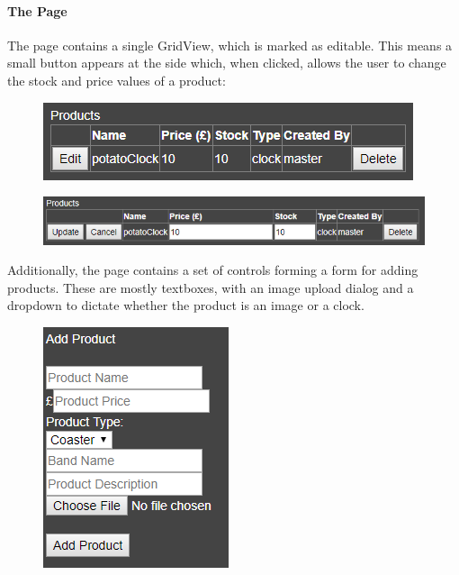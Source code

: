 ﻿\documentclass{article}
\begin{document}
    \paragraph{The Page}
    The page contains a single GridView, which is marked as editable.
    This means a small button appears at the side which, when clicked, allows the user to change the stock and price values of a product:
    \begin{figure}[H]
        \includegraphics{productsConfigTable.png}
        \centering
    \end{figure}
    \begin{figure}[H]
        \includegraphics{productsConfigEditing.png}
        \centering
    \end{figure}
    Additionally, the page contains a set of controls forming a form for adding products.
    These are mostly textboxes, with an image upload dialog and a dropdown to dictate whether the product is an image or a clock.
    \begin{figure}[H]
        \includegraphics{productForm.png}
        \centering
    \end{figure}
\end{document}
